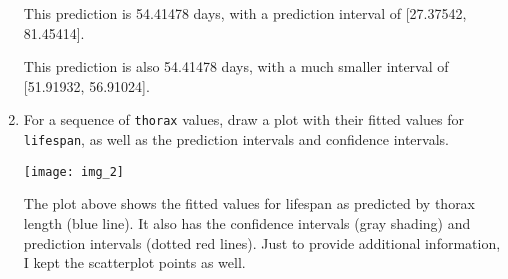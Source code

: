 \documentclass[12pt,letterpaper]{article}
\begin{document}
\begin{enumerate}


This prediction is 54.41478 days, with a prediction interval of [27.37542, 81.45414].



This prediction is also 54.41478 days, with a much smaller interval of [51.91932, 56.91024].
			\vspace{1cm}
			
	\item	For a sequence of \texttt{thorax} values, draw a plot with their fitted values for \texttt{lifespan}, as well as the prediction intervals and confidence intervals.
	\vspace{.2cm}
	


\texttt{[image: img\_2]}

The plot above shows the fitted values for lifespan as predicted by thorax length (blue line). It also has the confidence intervals (gray shading) and prediction intervals (dotted red lines). Just to provide additional information, I kept the scatterplot points as well.

\end{enumerate}
\end{document}
